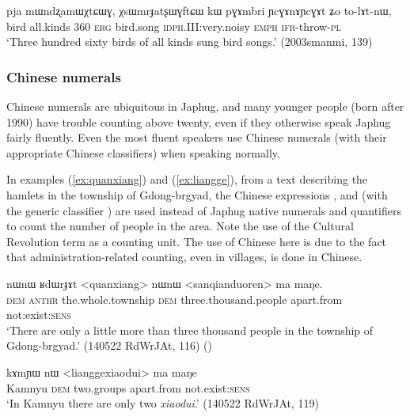 \begin{exe}
\ex \label{ex:gsum.brgya.drug.bcu}
\gll pja mɯndʐamɯχtɕɯɣ, χsɯmrɟatʂɯɣftɕɯ kɯ pɣɤmbri ɲcɣɤnɤɲcɣɤt ʑo to-lɤt-nɯ, \\
 bird all.kinds 360 \textsc{erg} bird.song \textsc{idph}.III:very.noisy \textsc{emph} \textsc{ifr}-throw-\textsc{pl} \\
\glt `Three hundred sixty birds of all kinds sung bird songs.' (2003smanmi, 139)
\end{exe}

\subsubsection{Chinese numerals}  \label{sec:chinese.numerals}
Chinese numerals are ubiquitous in Japhug, and many younger people (born after 1990) have trouble counting above twenty, even if they otherwise speak Japhug fairly fluently. Even the most fluent speakers use Chinese numerals (with their appropriate Chinese classifiers) when speaking normally. 

In examples (\ref{ex:quanxiang}) and (\ref{ex:liangge}), from a text describing the hamlets in the township of Gdong-brgyad, the Chinese expressions ,  and  (with the generic classifier ) are used instead of Japhug native numerals and quantifiers to count the number of people in the area. Note the use of the Cultural Revolution term  as a counting unit. The use of Chinese here is due to the fact that administration-related counting, even in villages, is done in Chinese.

\begin{exe}
\ex \label{ex:quanxiang}
\gll nɯnɯ ʁdɯrɟɤt <quanxiang> nɯnɯ <sanqianduoren> ma maŋe. \\
 \textsc{dem}  \textsc{anthr} the.whole.township \textsc{dem} three.thousand.people apart.from not:exist:\textsc{sens} \\
\glt  `There are only a little more than three thousand people in the township of Gdong-brgyad.' (140522 RdWrJAt, 116)
()
\end{exe}
 
\begin{exe}
\ex \label{ex:liangge}
\gll  kɤmɲɯ nɯ <lianggexiaodui> ma maŋe \\
 Kamnyu \textsc{dem} two.groups apart.from not.exist:\textsc{sens} \\
\glt `In Kamnyu there are only two \textit{xiaodui}.' (140522 RdWrJAt, 119)
\end{exe} 


